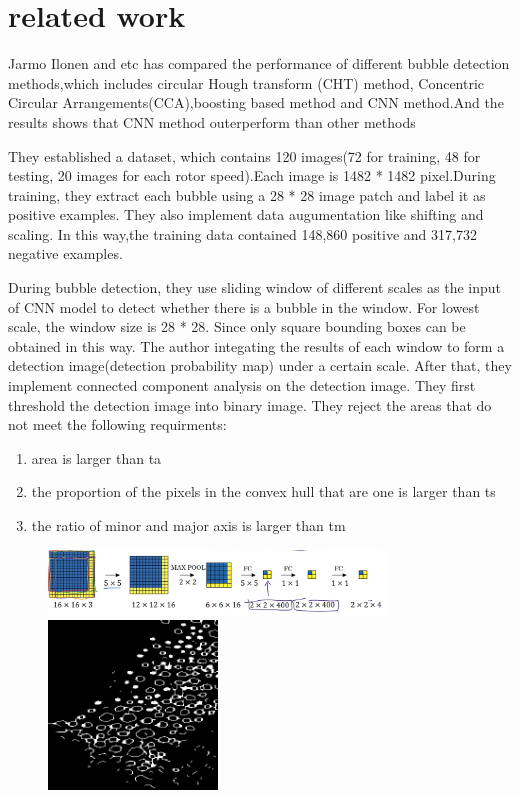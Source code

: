 \documentclass[11pt]{elegantpaper}
\begin{document}
\section{related work}
Jarmo Ilonen and etc has compared the performance of different bubble detection methods,which includes 
circular Hough transform (CHT) method, Concentric Circular Arrangements(CCA),boosting based method and 
CNN method.And the results shows that CNN method outerperform than other methods

They established a dataset, which contains 120 images(72 for training, 48 for testing, 20 images for each rotor speed).Each image is 1482 * 1482 pixel.During training,
they extract each bubble using a 28 * 28 image patch and label it as positive examples. They also implement data augumentation like 
shifting and scaling. In this way,the training data contained 148,860 positive and 317,732 negative examples.

During bubble detection, they use sliding window of different scales as the input of CNN model to detect whether there is a bubble in the window. For lowest scale, the window size is 28 * 28. 
Since only square bounding boxes can be obtained in this way. The author integating the results of each window to form a detection image(detection probability map) 
under a certain scale. After that, they implement connected component analysis on the detection image. They first threshold the detection image into binary image. 
They reject the areas that do not meet the following requirments:
\begin{enumerate}
	\item area is larger than ta
	\item the proportion of the pixels in the convex hull that are one is larger than ts
	\item the ratio of minor and major axis is larger than tm
\end{enumerate}
\begin{figure}[tbp]
    \centering
    \includegraphics[width=0.8\textwidth]{image/sliding_window.png}
    \includegraphics[width=0.4\textwidth]{../close.jpg}
\end{figure}
\end{document}
